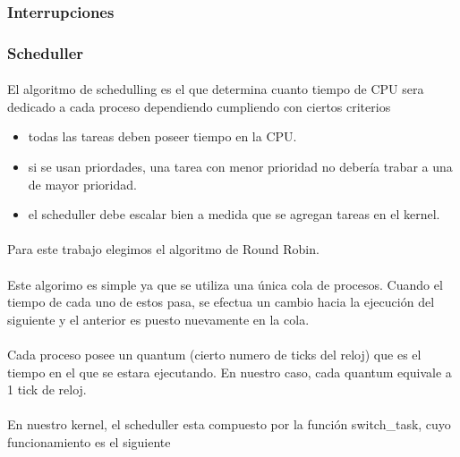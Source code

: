 \documentclass[11pt, a4paper]{article}
\begin{document}
		\subsubsection{Interrupciones}
		\subsubsection{Scheduller}
			\paragraph{}
				El algoritmo de schedulling es el que determina cuanto tiempo de CPU sera dedicado a cada proceso dependiendo cumpliendo con ciertos criterios
\begin{itemize}
	\item todas las tareas deben poseer tiempo en la CPU.
	\item si se usan priordades, una tarea con menor prioridad no debería trabar a una de mayor prioridad.
	\item el scheduller debe escalar bien a medida que se agregan tareas en el kernel.
\end{itemize}


\paragraph{}
Para este trabajo elegimos el algoritmo de Round Robin.

			\paragraph{}

Este algorimo es simple ya que se utiliza una única cola de procesos. Cuando el tiempo de cada uno de estos pasa, se efectua un cambio hacia la ejecución del siguiente y el anterior es puesto nuevamente en la cola. 
\paragraph{}
Cada proceso posee un quantum (cierto numero de ticks del reloj) que es el tiempo en el que se estara ejecutando. En nuestro caso, cada quantum equivale a 1 tick de reloj.


			\paragraph{}
			En nuestro kernel, el scheduller esta compuesto por la funci\'on switch\_task, cuyo funcionamiento es el siguiente
\end{document}
